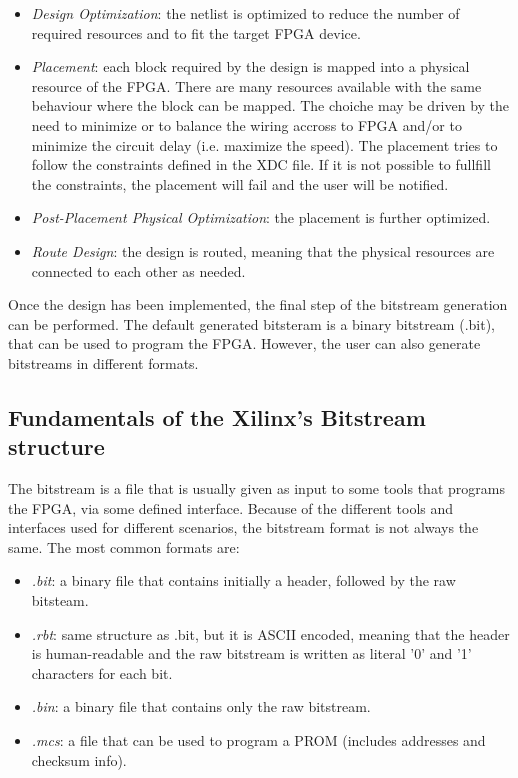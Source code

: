 \begin{itemize}
    \item \textit{Design Optimization}: the netlist is optimized to reduce the number of required resources and to fit the target FPGA device.
    \item \textit{Placement}: each block required by the design is mapped into a physical resource of the FPGA. There are many resources available with the same behaviour where the block can be mapped. The choiche may be driven by the need to minimize or to balance the wiring accross to FPGA and/or to minimize the circuit delay (i.e. maximize the speed). The placement tries to follow the constraints defined in the XDC file. If it is not possible to fullfill the constraints, the placement will fail and the user will be notified.
    \item \textit{Post-Placement Physical Optimization}: the placement is further optimized.
    \item \textit{Route Design}: the design is routed, meaning that the physical resources are connected to each other as needed. 
\end{itemize}

Once the design has been implemented, the final step of the bitstream generation can be performed. The default generated bitsteram is a binary bitstream (.bit), that can be used to program the FPGA. However, the user can also generate bitstreams in different formats.

\subsection{Fundamentals of the Xilinx's Bitstream structure}
\label{sec:bitstream_struct}

The bitstream is a file that is usually given as input to some tools that programs the FPGA, via some defined interface. Because of the different tools and interfaces used for different scenarios, the bitstream format is not always the same. The most common formats are:

\begin{itemize}
    \item \textit{.bit}: a binary file that contains initially a header, followed by the raw bitsteam.
    \item \textit{.rbt}: same structure as .bit, but it is ASCII encoded, meaning that the header is human-readable and the raw bitstream is written as literal '0' and '1' characters for each bit.
    \item \textit{.bin}: a binary file that contains only the raw bitstream.
    \item \textit{.mcs}: a file that can be used to program a PROM (includes addresses and checksum info).
\end{itemize}

